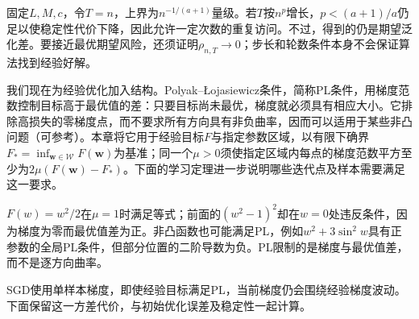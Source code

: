 固定$L,M,c$，令$T=n$，上界为$n^{-1/(a+1)}$量级。若$T$按$n^p$增长，$p<(a+1)/a$仍足以使稳定性代价下降，因此允许一定次数的重复访问。不过，得到的仍是期望泛化差。要接近最优期望风险，还须证明$\rho_{n,T}\to0$；步长和轮数条件本身不会保证算法找到经验好解。

我们现在为经验优化加入结构。Polyak--\L{}ojasiewicz条件，简称PL条件，用梯度范数控制目标高于最优值的差：只要目标尚未最优，梯度就必须具有相应大小。它排除高损失的零梯度点，而不要求所有方向具有非负曲率，因而可以适用于某些非凸问题（可参考）。本章将它用于经验目标$F$与指定参数区域，以有限下确界$F_*=\inf_{\bm w\in\mathcal W}F(\bm w)$为基准；同一个$\mu>0$须使指定区域内每点的梯度范数平方至少为$2\mu(F(\bm w)-F_*)$。下面的学习定理进一步说明哪些迭代点及样本需要满足这一要求。
\label{def:pl-condition}

$F(w)=w^2/2$在$\mu=1$时满足等式；前面的$(w^2-1)^2$却在$w=0$处违反条件，因为梯度为零而最优值差为正。非凸函数也可能满足PL，例如$w^2+3\sin^2w$具有正参数的全局PL条件，但部分位置的二阶导数为负。PL限制的是梯度与最优值差，而不是逐方向曲率。

SGD使用单样本梯度，即使经验目标满足PL，当前梯度仍会围绕经验梯度波动。下面保留这一方差代价，与初始优化误差及稳定性一起计算。

